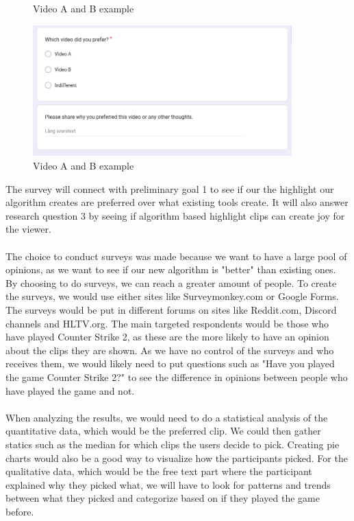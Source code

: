 \begin{itemize}
\begin{figure}[H]
        \caption{Video A and B example}
        \label{fig:VideoA_B}
    \end{figure}
    \begin{figure}[H]
        \centering
        \includegraphics[width=10cm]{Images/Questions_AB_reason_Survey.png}
        \caption{Video A and B example}
        \label{fig:VideoA_B_answer_reason}
    \end{figure}

\end{itemize}
The survey will connect with preliminary goal 1 to see if our the highlight our algorithm creates are preferred over what existing tools create. It will also answer research question 3 by seeing if algorithm based highlight clips can create joy for the viewer.\\\\
The choice to conduct surveys was made because we want to have a large pool of opinions, as we want to see if our new algorithm is "better" than existing ones. By choosing to do surveys, we can reach a greater amount of people. To create the surveys, we would use either sites like Surveymonkey.com or Google Forms. The surveys would be put in different forums on sites like Reddit.com, Discord channels and HLTV.org. The main targeted respondents would be those who have played Counter Strike 2, as these are the more likely to have an opinion about the clips they are shown. As we have no control of the surveys and who receives them, we would likely need to put questions such as "Have you played the game Counter Strike 2?" to see the difference in opinions between people who have played the game and not.\\\\
When analyzing the results, we would need to do a statistical analysis of the quantitative data, which would be the preferred clip. We could then gather statics such as the median for which clips the users decide to pick. Creating pie charts would also be a good way to visualize how the participants picked. For the qualitative data, which would be the free text part where the participant explained why they picked what, we will have to look for patterns and trends between what they picked and categorize based on if they played the game before.

